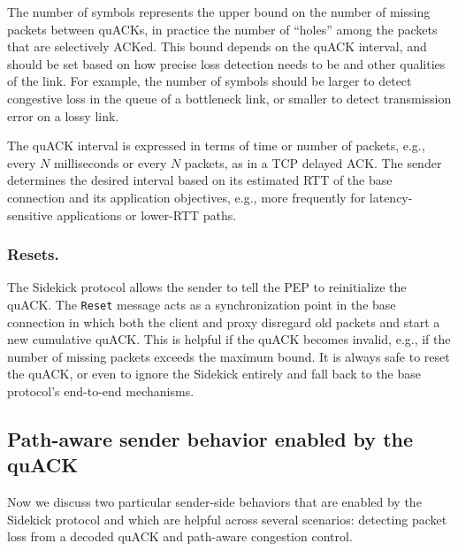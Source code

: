 The number of symbols represents the upper bound on the number of missing
packets between quACKs, in practice the number of ``holes'' among the packets
that are selectively ACKed. This bound depends on the quACK interval, and
should be set based on how precise loss detection needs to be and other
qualities of the link. For example, the number of symbols should be larger to
detect congestive loss in the queue of a bottleneck link, or smaller to detect
transmission error on a lossy link.

The quACK interval is expressed in terms of time or number of packets,
 e.g., every $N$ milliseconds or every $N$ packets, as in a TCP delayed ACK.
The sender determines the desired interval based on its estimated
RTT of the base connection and its application objectives, e.g.,
more frequently for latency-sensitive applications or lower-RTT paths.

\subsubsection{Resets.}
The Sidekick protocol allows the sender to tell the PEP to reinitialize the
quACK. The \texttt{Reset} message acts as a synchronization point in the base
connection in which both the client and proxy disregard old packets and start
a new cumulative quACK. This is helpful if the quACK becomes invalid, e.g.,
if the number of missing packets exceeds the maximum bound. It is always safe
to reset the quACK, or even to ignore the Sidekick entirely and fall back to the
base protocol's end-to-end mechanisms.


\subsection{Path-aware sender behavior enabled by the quACK}
\label{sec:sidekick:design:sender}

Now we discuss two particular sender-side behaviors that are enabled by the
Sidekick protocol and which are helpful across several scenarios: detecting
packet loss from a decoded quACK and path-aware congestion control.


